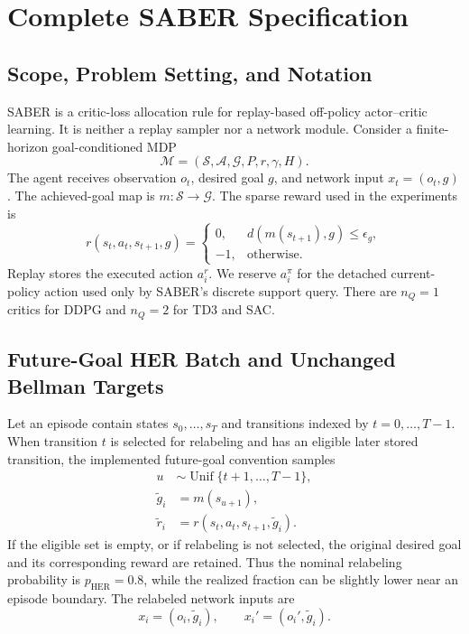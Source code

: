 \section{Complete SABER Specification}
\label{sec:supp-complete-saber}

\subsection{Scope, Problem Setting, and Notation}

SABER is a critic-loss allocation rule for replay-based off-policy
actor--critic learning. It is neither a replay sampler nor a network module.
Consider a finite-horizon goal-conditioned MDP
\[
\mathcal M=(\mathcal S,\mathcal A,\mathcal G,P,r,\gamma,H).
\]
The agent receives observation \(o_t\), desired goal \(g\), and network input
\(x_t=(o_t,g)\). The achieved-goal map is \(m:\mathcal S\rightarrow\mathcal G\).
The sparse reward used in the experiments is
\begin{equation}
r(s_t,a_t,s_{t+1},g)=
\begin{cases}
0, & d\!\left(m(s_{t+1}),g\right)\leq\epsilon_g,\\
-1, & \text{otherwise}.
\end{cases}
\label{eq:supp-sparse-reward}
\end{equation}
Replay stores the executed action \(a_i^r\). We reserve \(a_i^\pi\) for the
detached current-policy action used only by SABER's discrete support query.
There are \(n_Q=1\) critics for DDPG and \(n_Q=2\) for TD3 and SAC.

\subsection{Future-Goal HER Batch and Unchanged Bellman Targets}
\label{sec:supp-her-batch}

Let an episode contain states \(s_0,\ldots,s_T\) and transitions indexed by
\(t=0,\ldots,T-1\). When transition \(t\) is selected for relabeling and has
an eligible later stored transition, the implemented future-goal convention
samples
\begin{equation}
\begin{aligned}
u &\sim \operatorname{Unif}\{t+1,\ldots,T-1\},\\
\widetilde g_i &= m(s_{u+1}),\\
\widetilde r_i &= r(s_t,a_t,s_{t+1},\widetilde g_i).
\end{aligned}
\label{eq:supp-her-relabel}
\end{equation}
If the eligible set is empty, or if relabeling is not selected, the original
desired goal and its corresponding reward are retained. Thus the nominal
relabeling probability is \(p_{\mathrm{HER}}=0.8\), while the realized
fraction can be slightly lower near an episode boundary. The relabeled
network inputs are
\[
x_i=(o_i,\widetilde g_i),
\qquad
x_i'=(o_i',\widetilde g_i).
\]

